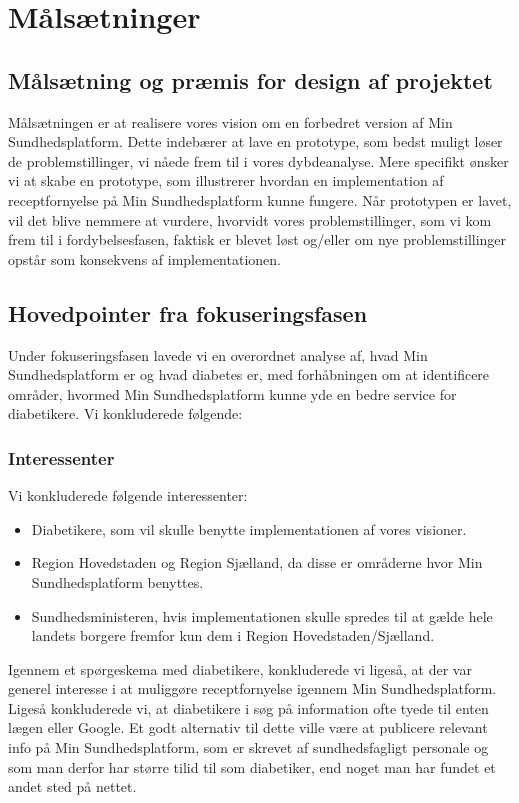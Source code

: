 \section{Målsætninger}
\subsection{Målsætning og præmis for design af projektet}
Målsætningen er at realisere vores vision om en forbedret version af Min Sundhedsplatform. Dette indebærer at lave en prototype, som bedst muligt løser de problemstillinger, vi nåede frem til i vores dybdeanalyse. Mere specifikt ønsker vi at skabe en prototype, som illustrerer hvordan en implementation af receptfornyelse på Min Sundhedsplatform kunne fungere. Når prototypen er lavet, vil det blive nemmere at vurdere, hvorvidt vores problemstillinger, som vi kom frem til i fordybelsesfasen, faktisk er blevet løst og/eller om nye problemstillinger opstår som konsekvens af implementationen. 
\subsection{Hovedpointer fra fokuseringsfasen}
Under fokuseringsfasen lavede vi en overordnet analyse af, hvad Min Sundhedsplatform er og hvad diabetes er, med forhåbningen om at identificere områder, hvormed Min Sundhedsplatform kunne yde en bedre service for diabetikere. Vi konkluderede følgende:
\subsubsection{Interessenter}
Vi konkluderede følgende interessenter:
\begin{itemize}
\item Diabetikere, som vil skulle benytte implementationen af vores visioner.
\item Region Hovedstaden og Region Sjælland, da disse er områderne hvor Min Sundhedsplatform benyttes.
\item Sundhedsministeren, hvis implementationen skulle spredes til at gælde hele landets borgere fremfor kun dem i Region Hovedstaden/Sjælland.
\end{itemize}
Igennem et spørgeskema med diabetikere, konkluderede vi ligeså, at der var generel interesse i at muliggøre receptfornyelse igennem Min Sundhedsplatform.\\
Ligeså konkluderede vi, at diabetikere i søg på information ofte tyede til enten lægen eller Google. Et godt alternativ til dette ville være at publicere relevant info på Min Sundhedsplatform, som er skrevet af sundhedsfagligt personale og som man derfor har større tilid til som diabetiker, end noget man har fundet et andet sted på nettet. 
